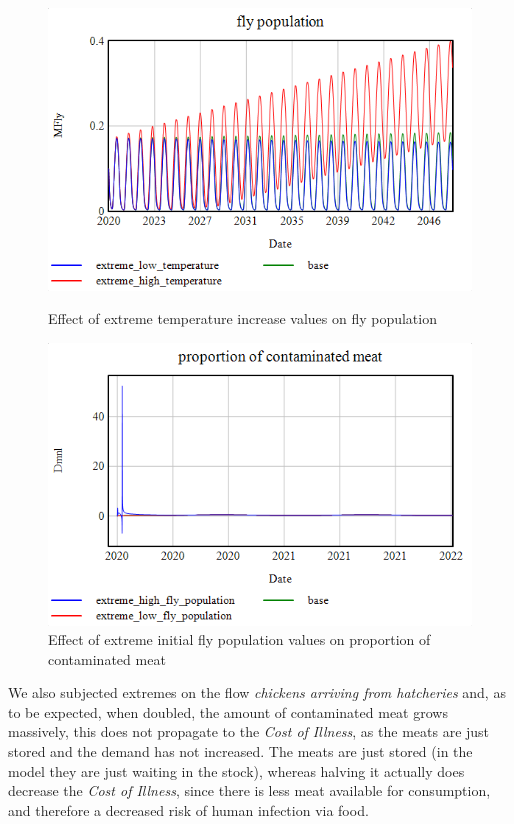 \begin{figure}[h!]
    \centering
    \begin{minipage}{0.45\textwidth}
        \centering
        \includegraphics[width=\textwidth]{images/extremes/Temperature_fly_population.png} 
        \caption{Effect of extreme temperature increase values on fly population}
        \label{fig:temp_fly}
    \end{minipage}
    \begin{minipage}{0.45\textwidth}
        \centering
        \includegraphics[width=\textwidth]{images/extremes/Fly_population_contaminated_meat.png} 
        \caption{Effect of extreme initial fly population values on proportion of contaminated meat}
        \label{fig:fly_meat}
    \end{minipage}
\end{figure}

We also subjected extremes on the flow \textit{chickens arriving from hatcheries} and, as to be expected, when doubled, the amount of contaminated meat grows massively, this does not propagate to the \textit{Cost of Illness}, as the meats are just stored and the demand has not increased. The meats are just stored (in the model they are just waiting in the stock), whereas halving it actually does decrease the \textit{Cost of Illness}, since there is less meat available for consumption, and therefore a decreased risk of human infection via food.

